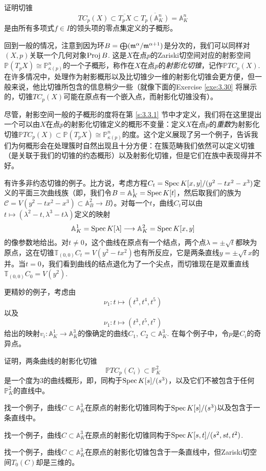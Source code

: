 \begin{exe}\label{exe:3.29}
	证明切锥
	\[
		TC_p(X)\subset \overline{T_pX}\subset \overline{T_p(\mathbb A_K^n)}=\mathbb A_K^n
	\]
	是由所有多项式$f\in I$的领头项的零点集定义的子概形。
\end{exe}

回到一般的情况，注意到因为环$B=\bigoplus (\mathfrak{m}^\alpha/\mathfrak{m}^{\alpha+1})$是分次的，我们可以同样对$(X,p)$关联一个几何对象$\operatorname{Proj} B$. 这是$X$在点$p$的Zariski切空间对应的射影空间$\mathbb P(T_p X)\cong \mathbb P^n_{\kappa(p)}$的一个子概形，称作在$X$在点$p$的\textit{射影化切锥}，记作$\mathbb PTC_p(X)$. 在许多情况中，处理作为射影概形以及比切锥少一维的射影化切锥会更方便，但一般来说，他比切锥所包含的信息稍少一些（就像下面的Exercise \ref{exe:3.30} 将展示的，切锥$TC_p(X)$可能在原点有一个嵌入点，而射影化切锥没有）。

尽管，射影空间一般的子概形的度将在第 \ref{s:3.3.1} 节中才定义，我们将在这里提出一个可以由$X$在点$p$的射影化切锥定义的概形不变量：定义$X$在点$p$的\textit{重数}为射影化切锥$\mathbb PTC_p(X)\subset \mathbb P(T_p X)\cong \mathbb P^n_{\kappa(p)}$的度。这个定义展现了另一个例子，告诉我们为何概形会在处理簇时自然出现且十分方便：在簇范畴我们依然可以定义切锥（是关联于我们的切锥的约态概形）以及射影化切锥，但是它们在族中表现得并不好。


有许多非约态切锥的例子。比方说，考虑方程$C_t=\operatorname{Spec} K[x,y]/(y^2-tx^2-x^3)$定义的平面三次曲线族（即，我们令$B=\mathbb A^1_K=\operatorname{Spec} K[t]$，然后取我们的族为$\mathscr C=V(y^2-tx^2-x^3)\subset \mathbb A_B^2\to B$）。对每一个$t$，曲线$C_t$可以由$t\mapsto (\lambda^2-t,\lambda^3-t\lambda)$定义的映射
\[
	\mathbb A_K^1=\operatorname{Spec} K[\lambda]\longrightarrow \mathbb A_K^2=\operatorname{Spec} K[x,y]
\]
的像参数地给出。对$t\neq 0$，这个曲线在原点有一个结点，两个点$\lambda =\pm \sqrt t$都映为原点，这在切锥$\mathbb T_{(0,0)}C_t=V(y^2-tx^2)$也有所反应，它是两条直线$y=\pm \sqrt t x$的并。当$t=0$，我们看到曲线的结点退化为了一个尖点，而切锥现在是双重直线$\mathbb T_{(0,0)}C_0=V(y^2)$.

更精妙的例子，考虑由
\[
	\nu_1:t\longmapsto (t^3,t^4,t^5)
\]
以及
\[
	\nu_1:t\longmapsto (t^3,t^5,t^7)
\]
给出的映射$v_i:\mathbb A_K^1\to \mathbb A_K^3$的像确定的曲线$C_1$, $C_2\subset \mathbb A_K^3$. 在每个例子中，令$p$是$C_i$的奇异点。

\begin{exe}\label{exe:3.30}
	\begin{compactenum}[(a)]
		\item 证明，两条曲线的射影化切锥
		\[
			\mathbb PTC_p(C_i)\subset \mathbb P_K^2
		\]
		是一个度为$3$的曲线概形，即，同构于$\operatorname{Spec} K[s]/(s^3)$，以及它们不被包含于任何$\mathbb P_K^2$的直线中。
		\item 找一个例子，曲线$C\subset \mathbb A_K^3$在原点的射影化切锥同构于$\operatorname{Spec} K[s]/(s^3)$以及包含于一条直线中。
		\item 找一个例子，曲线$C\subset \mathbb A_K^3$在原点的射影化切锥同构于$\operatorname{Spec} K[s,t]/(s^2,st,t^2)$.
		\item 找一个例子，曲线$C\subset \mathbb A_K^3$在原点的射影化切锥包含于一条直线中，但Zariski切空间$T_0(C)$却是三维的。
	\end{compactenum}
\end{exe}

